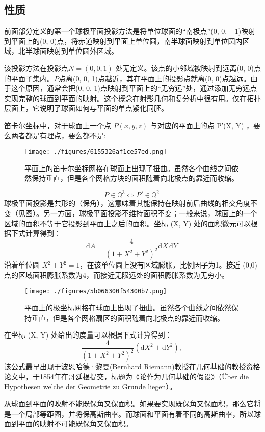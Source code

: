 \subsection{性质}
前面部分定义的第一个球极平面投影方法是将单位球面的“南极点”(0, 0, −1)映射到平面上的(0, 0)点，将赤道映射到平面上单位圆，南半球面映射到单位圆内区域，北半球面映射到单位圆外区域。

该投影方法在投影点$N = (0, 0, 1)$ 处无定义。该点的小邻域被映射到远离(0, 0)点的平面子集内。$P$点离(0, 0, 1)点越近，其在平面上的投影点就离(0, 0)点越远。由于这个原因，通常会把(0, 0, 1)点映射到平面上的“无穷远”处，通过添加无穷远点实现完整的球面到平面的映射。这个概念在射影几何和复分析中很有用。仅在拓扑层面上，它说明了球面如何与平面的单点紧化同胚。

笛卡尔坐标中，对于球面上一个点 $P(x, y, z)$ 与对应的平面上的点 P′(X, Y) ，要么两者都是有理点，要么都不是:
\begin{figure}[ht]
\centering
\texttt{[image: ./figures/6155326af1ce57ed.png]}
\caption{平面上的笛卡尔坐标网格在球面上出现了扭曲。虽然各个曲线之间依然保持垂直，但是各个网格方块的面积随着向北极点的靠近而收缩。} \label{fig_QJPMTY_6}
\end{figure}
$$P \in \mathbb{Q}^3 \Longleftrightarrow P' \in \mathbb{Q}^2~$$
球极平面投影是共形的（保角），这意味着其能保持在映射前后曲线的相交角度不变（见图）。另一方面，球极平面投影不维持面积不变；一般来说，球面上的一个区域的面积不等于它投影到平面上之后的面积。坐标 (X, Y) 处的面积微元可以根据下式计算得到：
$$\mathrm{d}A = \frac{4}{(1 + X^2 + Y^2)^2} \mathrm{d}X \, \mathrm{d}Y~$$
沿着单位圆 \(X^2 + Y^2 = 1\)，在该单位圆上没有区域膨胀，比例因子为1。接近 (0,0) 点的区域面积膨胀系数为4，而接近无限远处的面积膨胀系数为无穷小。
\begin{figure}[ht]
\centering
\texttt{[image: ./figures/5b066300f54300b7.png]}
\caption{平面上的极坐标网格在球面上出现了扭曲。虽然各个曲线之间依然保持垂直，但是各个网格扇区的面积随着向北极点的靠近而收缩。} \label{fig_QJPMTY_7}
\end{figure}
在坐标 (X, Y) 处给出的度量可以根据下式计算得到：
$$\frac{4}{(1 + X^2 + Y^2)^2} (\mathrm{d}X^2 + \mathrm{d}Y^2),~$$
该公式最早出现于波恩哈德·黎曼(Bernhard Riemann)教授在几何基础的教授资格论文中，于1854年在哥廷根提交，标题为《论作为几何基础的假设》（Über die Hypothesen welche der Geometrie zu Grunde liegen）。

从球面到平面的映射不能既保角又保面积。如果要实现既保角又保面积，那么它将是一个局部等距图，并将保高斯曲率。而球面和平面有着不同的高斯曲率，所以球面到平面的映射不可能既保角又保面积。

